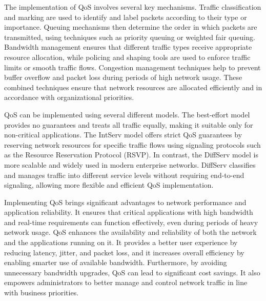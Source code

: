 The implementation of QoS involves several key mechanisms. Traffic classification and marking are used to identify and label packets according to their type or importance. Queuing mechanisms then determine the order in which packets are transmitted, using techniques such as priority queuing or weighted fair queuing. Bandwidth management ensures that different traffic types receive appropriate resource allocation, while policing and shaping tools are used to enforce traffic limits or smooth traffic flows. Congestion management techniques help to prevent buffer overflow and packet loss during periods of high network usage. These combined techniques ensure that network resources are allocated efficiently and in accordance with organizational priorities.\cite{paloalto_networks_what_nodate}\cite{hpe_juniper_networking_what_nodate}\cite{rhim_what_2024}


QoS can be implemented using several different models. The best-effort model provides no guarantees and treats all traffic equally, making it suitable only for non-critical applications.\cite{bruno_wan_2024} The \ac{IntServ} model offers strict QoS guarantees by reserving network resources for specific traffic flows using signaling protocols such as the Resource Reservation Protocol (RSVP).\cite{networklessons_introduction_nodate} In contrast, the \ac{DiffServ} model is more scalable and widely used in modern enterprise networks. DiffServ classifies and manages traffic into different service levels without requiring end-to-end signaling, allowing more flexible and efficient QoS implementation.\cite{bruno_wan_2024}


Implementing QoS brings significant advantages to network performance and application reliability. It ensures that critical applications with high bandwidth and real-time requirements can function effectively, even during periods of heavy network usage. QoS enhances the availability and reliability of both the network and the applications running on it. It provides a better user experience by reducing latency, jitter, and packet loss, and it increases overall efficiency by enabling smarter use of available bandwidth. Furthermore, by avoiding unnecessary bandwidth upgrades, QoS can lead to significant cost savings. It also empowers administrators to better manage and control network traffic in line with business priorities.\cite{hpe_juniper_networking_what_nodate}\cite{paloalto_networks_what_nodate}\cite{fortinet_what_nodate}
